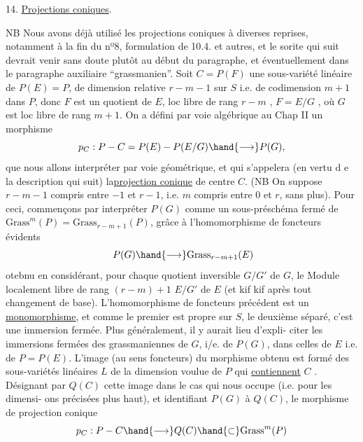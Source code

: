 
14. \uline{Projections coniques}.

NB Nous avons déjà utilisé les projections coniques à diverses
\placedmargin{$\|$}reprises, notamment à la fin du nº8, formulation de 10.4. et autres, et
le sorite qui suit devrait venir sans doute plutôt au début du paragraphe,
et éventuellement dans le paragraphe auxiliaire ``grassmanien''.
Soit $C = P(F)$ une sous-variété linéaire de $P(E)=P$, de dimension
relative $r-m-1$  sur $S$ i.e. de codimension $m+1$ dans $P$, donc $F$ est un quotient de $E$, loc libre de
rang $r-m$ , $F=E/G$ , où $G$ est loc libre de rang $m+1$. On a défini
par voie algébrique au Chap II un morphisme
\[ p_C : P - C = P(E) - P(E/G) \hand{\longrightarrow} P(G) , \]
que nous allons interpréter par voie géométrique, et qui s'appelera
(en vertu d e la description qui suit) la\uline{projection conique} de centre $C$.
(NB On suppose $r-m-1$ compris entre $-1$ et $r-1$, i.e. $m$ compris entre $0$
et $r$, sans plus). Pour ceci, commençons par interpréter  $P(G)$
comme un sous-préschéma fermé de $\mathrm{Grass}^m(P)= \mathrm{Grass}_{r-m+1}(P)$, grâce à l'homomorphisme
de foncteurs évidents
\[ \ P(G) \hand{\longrightarrow} \mathrm{Grass}_{r-m+1}(E) \]
otebnu en considérant, pour chaque quotient inversible $G/G'$ de $G$, le
Module localement libre de rang $(r-m)+1$ $E/G'$ de $E$ (et kif kif après
tout changement de base). L'homomorphisme de foncteurs précédent est un
\uline{monomorphisme}, et comme le premier est propre sur $S$, le deuxième séparé,
c'est une immersion fermée. Plus généralement, il y aurait lieu d'expli-%
citer les immersions fermées des grassmaniennes de $G$, i/e. de $P(G)$,
dans celles de $E$ i.e. de $P=P(E)$.  L'image (au sens foncteurs) du morphisme obtenu est formé des
sous-variétés linéaires  $L$ de la dimension voulue de $P$ qui \uline{contiennent} $C$ . Désignant
par $Q(C)$ cette image dans le cas qui nous occupe (i.e. pour les dimensi-%
ons précisées plus haut), et identifiant $P(G)$ à $Q(C)$, le morphisme
de projection conique
\[ p_C : P - C \hand{\longrightarrow} Q(C) \hand{\subset} \mathrm{Grass}^m(P) \]

